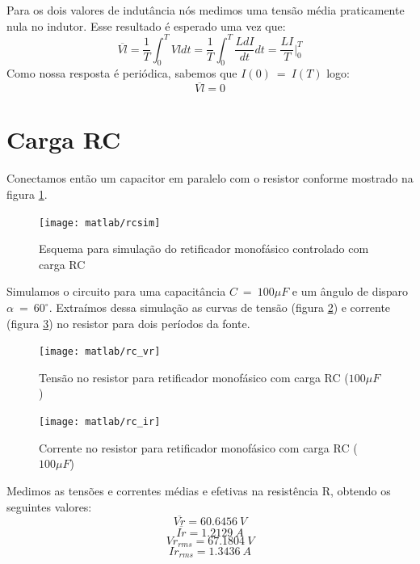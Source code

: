 \documentclass{report}
\begin{document}
Para os dois valores de indutância nós medimos uma tensão média praticamente nula no indutor. Esse resultado é esperado uma vez que:
\begin{equation}
	\overline{Vl} = \frac{1}{T}\int_{0}^{T}Vl dt = \frac{1}{T}\int_{0}^{T}\frac{LdI}{dt} dt = \frac{LI}{T}\bigg\rvert_0^T
\end{equation}
Como nossa resposta é periódica, sabemos que $I(0)\ =\ I(T)$ logo:
\begin{equation}
	\overline{Vl} = 0
\end{equation}

\section{Carga RC}
Conectamos então um capacitor em paralelo com o resistor conforme mostrado na figura \ref{fig:rcsim}.
\begin{figure}[H]
	\centering
	\texttt{[image: matlab/rcsim]}
	\caption{Esquema para simulação do retificador monofásico controlado com carga RC}
	\label{fig:rcsim}
\end{figure}

Simulamos o circuito para uma capacitância $C\ =\ 100\mu F$ e um ângulo de disparo $\alpha\ =\ 60^\circ$. Extraímos dessa simulação as curvas de tensão (figura \ref{fig:rcvr}) e corrente (figura \ref{fig:rcir}) no resistor para dois períodos da fonte.
\begin{figure}[H]
	\centering
	\texttt{[image: matlab/rc\_vr]}
	\caption{Tensão no resistor para retificador monofásico com carga RC ($100\mu F$)}
	\label{fig:rcvr}
\end{figure}
\begin{figure}[H]
	\centering
	\texttt{[image: matlab/rc\_ir]}
	\caption{Corrente no resistor para retificador monofásico com carga RC ($100\mu F$)}
	\label{fig:rcir}
\end{figure}

Medimos as tensões e correntes médias e efetivas na resistência R, obtendo os seguintes valores:
\begin{equation}
\overline{Vr} = 60.6456\ V
\end{equation}
\begin{equation}
\overline{Ir} = 1.2129\ A
\end{equation}
\begin{equation}
Vr_{rms} = 67.1804\ V
\end{equation}
\begin{equation}
Ir_{rms} = 1.3436\ A
\end{equation}
\end{document}
